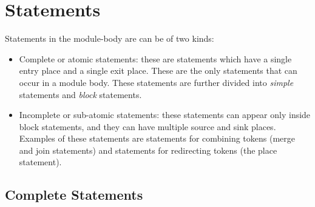 \documentclass{article}
\begin{document}
\section{Statements} \label{sec:Statements}
 
Statements in the module-body are can be of two kinds:
\begin{itemize}
\item Complete or atomic statements: these are statements
which have a single
entry place and a single exit place.  These are
the only statements that can occur in a module body.
These statements are further divided into 
{\em simple} statements and {\em block} statements.
\item Incomplete or sub-atomic statements:  these statements
can appear only inside block statements,  and they
can have multiple source and sink places.
Examples of these statements are statements for
combining tokens (merge and join statements) and
statements for redirecting tokens (the place statement).
\end{itemize}


\subsection{Complete Statements}
\end{document}
